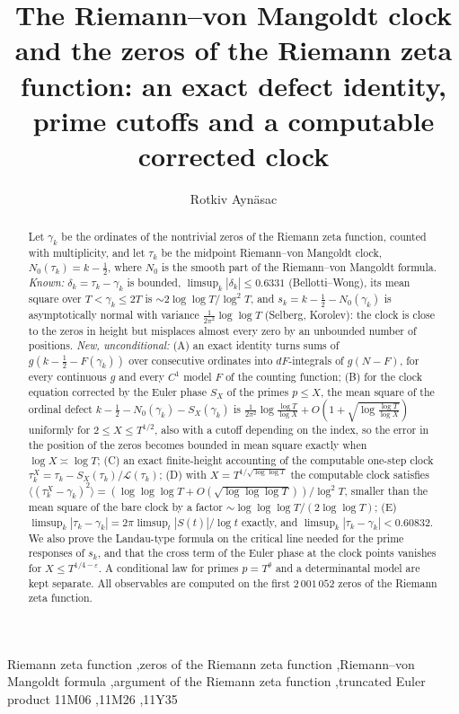 \documentclass[preprint,12pt]{elsarticle}
\numberwithin{equation}{section}
\theoremstyle{plain}
\theoremstyle{definition}
\theoremstyle{remark}
\newcommand{\NO}{N_0}
\newcommand{\lL}{\mathcal L}
\begin{document}
\begin{frontmatter}
\title{The Riemann--von Mangoldt clock and the zeros of the Riemann zeta function: an exact defect identity, prime cutoffs and a computable corrected clock}
\author{Rotkiv Ayn\"asac}

\begin{abstract}
Let $\gamma_k$ be the ordinates of the nontrivial zeros of the Riemann zeta function, counted with multiplicity, and let $\tau_k$ be the midpoint Riemann--von Mangoldt clock, $\NO(\tau_k)=k-\frac12$, where $\NO$ is the smooth part of the Riemann--von Mangoldt formula. \emph{Known:} $\delta_k=\tau_k-\gamma_k$ is bounded, $\limsup_k|\delta_k|\le0.6331$ (Bellotti--Wong), its mean square over $T<\gamma_k\le2T$ is $\sim2\log\log T/\log^2T$, and $s_k=k-\frac12-\NO(\gamma_k)$ is asymptotically normal with variance $\frac1{2\pi^2}\log\log T$ (Selberg, Korolev): the clock is close to the zeros in height but misplaces almost every zero by an unbounded number of positions. \emph{New, unconditional:} (A) an exact identity turns sums of $g(k-\frac12-F(\gamma_k))$ over consecutive ordinates into $dF$-integrals of $g(N-F)$, for every continuous $g$ and every $C^1$ model $F$ of the counting function; (B) for the clock equation corrected by the Euler phase $S_X$ of the primes $p\le X$, the mean square of the ordinal defect $k-\frac12-\NO(\gamma_k)-S_X(\gamma_k)$ is $\frac1{2\pi^2}\log\frac{\log T}{\log X}+O(1+\sqrt{\log\frac{\log T}{\log X}})$ uniformly for $2\le X\le T^{1/2}$, also with a cutoff depending on the index, so the error in the position of the zeros becomes bounded in mean square exactly when $\log X\asymp\log T$; (C) an exact finite-height accounting of the computable one-step clock $\tau_k^X=\tau_k-S_X(\tau_k)/\lL(\tau_k)$; (D) with $X=T^{1/\sqrt{\log\log T}}$ the computable clock satisfies $\langle(\tau_k^X-\gamma_k)^2\rangle=(\log\log\log T+O(\sqrt{\log\log\log T}))/\log^2T$, smaller than the mean square of the bare clock by a factor $\sim\log\log\log T/(2\log\log T)$; (E) $\limsup_k|\tau_k-\gamma_k|=2\pi\limsup_t|S(t)|/\log t$ exactly, and $\limsup_k|\tau_k-\gamma_k|<0.60832$. We also prove the Landau-type formula on the critical line needed for the prime responses of $s_k$, and that the cross term of the Euler phase at the clock points vanishes for $X\le T^{1/4-\varepsilon}$. A conditional law for primes $p=T^\theta$ and a determinantal model are kept separate. All observables are computed on the first $2\,001\,052$ zeros of the Riemann zeta function.
\end{abstract}

\begin{keyword}
Riemann zeta function \sep zeros of the Riemann zeta function \sep Riemann--von Mangoldt formula \sep argument of the Riemann zeta function \sep truncated Euler product
\MSC[2020] 11M06 \sep 11M26 \sep 11Y35
\end{keyword}
\end{frontmatter}
\end{document}
